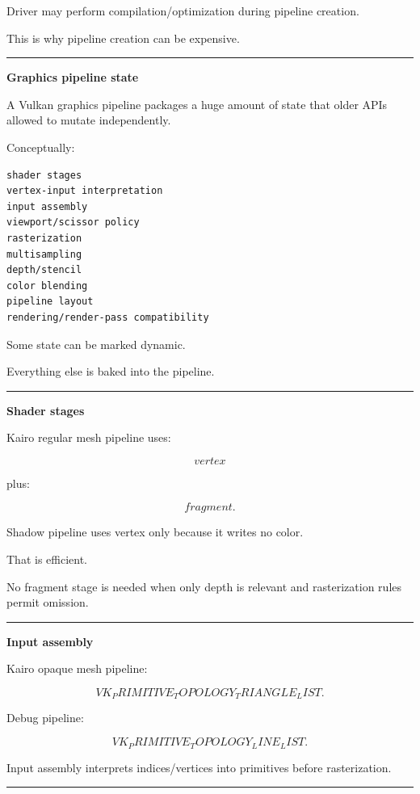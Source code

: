 Driver may perform compilation/optimization during pipeline creation.

This is why pipeline creation can be expensive.

\begin{center}\rule{0.5\linewidth}{0.5pt}\end{center}

\textbf{Graphics pipeline state}

A Vulkan graphics pipeline packages a huge amount of state that older APIs allowed to mutate independently.

Conceptually:

\begin{verbatim}
shader stages
vertex-input interpretation
input assembly
viewport/scissor policy
rasterization
multisampling
depth/stencil
color blending
pipeline layout
rendering/render-pass compatibility
\end{verbatim}

Some state can be marked dynamic.

Everything else is baked into the pipeline.

\begin{center}\rule{0.5\linewidth}{0.5pt}\end{center}

\textbf{Shader stages}

Kairo regular mesh pipeline uses:

\[
vertex
\]

plus:

\[
fragment.
\]

Shadow pipeline uses vertex only because it writes no color.

That is efficient.

No fragment stage is needed when only depth is relevant and rasterization rules permit omission.

\begin{center}\rule{0.5\linewidth}{0.5pt}\end{center}

\textbf{Input assembly}

Kairo opaque mesh pipeline:

\[
VK_PRIMITIVE_TOPOLOGY_TRIANGLE_LIST.
\]

Debug pipeline:

\[
VK_PRIMITIVE_TOPOLOGY_LINE_LIST.
\]

Input assembly interprets indices/vertices into primitives before rasterization.

\begin{center}\rule{0.5\linewidth}{0.5pt}\end{center}

